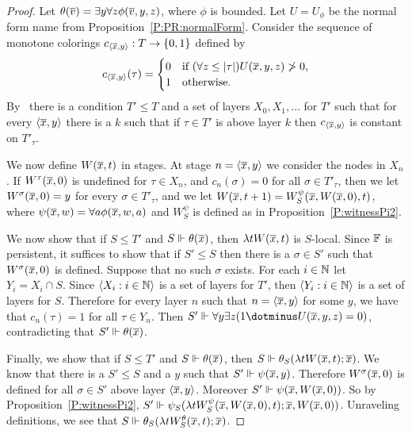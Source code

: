 \begin{proof}
Let $\theta(\overline{v})=\exists y\forall z\phi(\overline{v},y,z)$,
where $\phi$ is bounded.
Let $U=U_\phi$ be the normal form name from Proposition~\ref{P:PR:normalForm}.
Consider the sequence of monotone colorings
$c_{\left\langle \overline{x},y\right\rangle}:T\to\{0,1\}$ defined by
$$c_{\left\langle \overline{x},y\right\rangle}(\tau)=\begin{cases}
0&\text{if }(\forall z\leq|\tau|)U(\overline{x},y,z)\not>0,\\
1&\text{otherwise.}
\end{cases}$$
By \MCP\ there is a condition $T'\leq T$ and a set of layers
$X_0,X_1,\ldots$ for $T'$ such that
for every $\left\langle \overline{x},y\right\rangle$ there is a $k$ such that if $\tau\in T'$ is above layer $k$
then $c_{\left\langle \overline{x},y\right\rangle}$ is constant on $T'_\tau$.

We now define $W(\overline{x},t)$ in stages.
At stage $n=\langle \overline{x},y\rangle$ we consider the nodes in $X_n$.
If $W^\tau(\overline{x},0)$ is undefined for $\tau\in X_n$,
and $c_n(\sigma)=0$ for all $\sigma\in T'_\tau$,
then we let $W^\sigma(\overline{x},0)=y$ for every $\sigma\in T'_\tau$,
and we let $W(\overline{x},t+1)=W^\psi_S(\overline{x},W(\overline{x},0),t)$,
where $\psi(\overline{x},w)=\forall a\phi(\overline{x},w,a)$ and
$W^\psi_S$ is defined as in Proposition~\ref{P:witnessPi2}.

We now show that if $S\leq T'$ and $S\Vdash\theta(\overline{x})$,
then $\lambda tW(\overline{x},t)$ is $S$-local.
Since $\mathbb{F}$ is persistent, it suffices to show that if $S'\leq S$
then there is a $\sigma\in S'$ such that $W^\sigma(\overline{x},0)$ is defined.
Suppose that no such $\sigma$ exists.
For each $i\in\mathbb{N}$ let $Y_i=X_i\cap S$.
Since $\left\langle X_i:i\in\mathbb{N}\right\rangle$ is a set of layers for $T'$,
then $\left\langle Y_i:i\in\mathbb{N}\right\rangle$ is a set of layers for $S$.
Therefore for every layer $n$ such that $n=\left\langle \overline{x},y\right\rangle$
for some $y$, we have that $c_n(\tau)=1$ for all $\tau\in Y_n$.
Then $S'\Vdash\forall y\exists z(1\dotminus U(\tup{x},y,z)=0)$,
contradicting that $S'\Vdash\theta(\overline{x})$.

Finally, we show that if $S\leq T'$ and $S\Vdash\theta(\overline{x})$,
then $S\Vdash\theta_S(\lambda tW(\overline{x},t);\overline{x})$.
We know that there is a $S'\leq S$ and a $y$ such that
$S'\Vdash\psi(\overline{x},y)$.
Therefore $W^\sigma(\overline{x},0)$ is defined for all $\sigma\in S'$
above layer $\left\langle \overline{x},y\right\rangle$.
Moreover $S'\Vdash\psi(\overline{x},W(\overline{x},0))$.
So by Proposition~\ref{P:witnessPi2},
$S'\Vdash\psi_S(\lambda tW^\psi_S(\overline{x},W(\overline{x},0),t);\overline{x},W(\overline{x},0))$.
Unraveling definitions, we see that $S\Vdash\theta_S(\lambda tW^\theta_S(\overline{x},t);\overline{x})$.
\end{proof}

